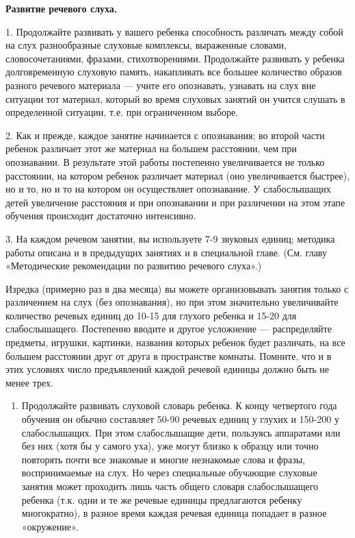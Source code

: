 \documentclass[a5paper]{book}
\begin{document}
\textbf{Развитие речевого слуха.}

1. Продолжайте развивать у вашего ребенка способность различать между
собой на слух разнообразные слуховые комплексы, выраженные словами,
словосочетаниями, фразами, стихотворениями. Продолжайте развивать у
ребенка долговременную слуховую память, накапливать все большее
количество образов разного речевого материала --- учите его опознавать,
узнавать на слух вне ситуации тот материал, который во время слуховых
занятий он учится слушать в определенной ситуации, т.е. при ограниченном
выборе.

2. Как и прежде, каждое занятие начинается с опознавания; во второй
части ребенок различает этот же материал на большем расстоянии, чем при
опознавании. В результате этой работы постепенно увеличивается не только
расстоянии, на котором ребенок различает материал (оно увеличивается
быстрее), но и то, но и то на котором он осуществляет опознавание. У
слабослышащих детей увеличение расстояния и при опознавании и при
различении на этом этапе обучения происходит достаточно интенсивно.

3. На каждом речевом занятии, вы используете 7-9 звуковых единиц;
методика работы описана и в предыдущих занятиях и в специальной главе.
(См. главу «Методические рекомендации по развитию речевого слуха».)

Изредка (примерно раз в два месяца) вы можете организовывать занятия
только с различением на слух (без опознавания), но при этом значительно
увеличивайте количество речевых единиц до 10-15 для глухого ребенка и
15-20 для слабослышащего. Постепенно вводите и другое усложнение ---
распределяйте предметы, игрушки, картинки, названия которых ребенок
будет различать, на все большем расстоянии друг от друга в пространстве
комнаты. Помните, что и в этих условиях число предъявлений каждой
речевой единицы должно быть не менее трех.


\begin{enumerate}
\def\labelenumi{\arabic{enumi}.}
\setcounter{enumi}{3}
\item
  
  Продолжайте развивать слуховой словарь ребенка. К концу четвертого
  года обучения он обычно составляет 50-90 речевых единиц у глухих и
  150-200 у слабослышащих. При этом слабослышащие дети, пользуясь
  аппаратами или без них (хотя бы у самого уха), уже могут близко к
  образцу или точно повторять почти все знакомые и многие незнакомые
  слова и фразы, воспринимаемые на слух. Но через специальные обучающие
  слуховые занятия может проходить лишь часть общего словаря
  слабослышащего ребенка (т.к. одни и те же речевые единицы предлагаются
  ребенку многократно), в разное время каждая речевая единица попадает в
  разное «окружение».
  
\end{enumerate}
\end{document}
